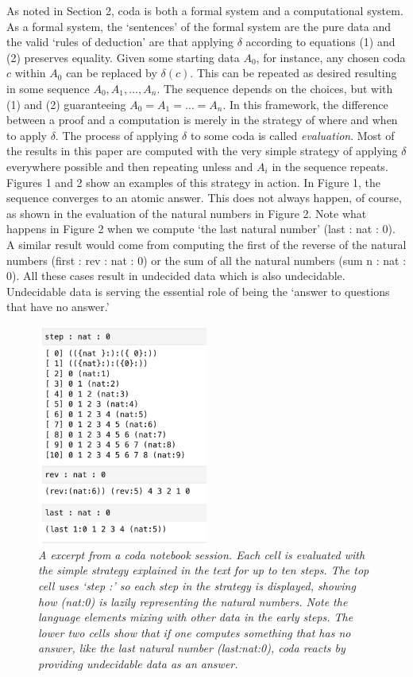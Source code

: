 \documentclass[11pt]{article}
\begin{document}
     As noted in Section 2, coda is both a formal system and a computational system.  As a formal system, the `sentences' of the formal system
are the pure data and the valid `rules of deduction' are that applying $\delta$ according to equations (1) and (2) preserves equality.
Given some starting data $A_0$, for instance, any chosen coda $c$ within $A_0$ can be replaced by $\delta(c)$.  This can be repeated
as desired resulting in some sequence $A_0,A_1,\dots,A_n$.  The sequence depends on the choices, but with (1) and (2) guaranteeing
$A_0=A_1=\dots=A_n$.  In this framework, the difference between a proof and a computation is merely in the strategy of where and
when to apply $\delta$.  The process of applying $\delta$ to some coda is called {\it evaluation}.  Most of the results in this paper
are computed with the very simple strategy of applying $\delta$ everywhere possible and then repeating unless and $A_i$ in the sequence
repeats.  Figures 1 and 2 show an examples of this strategy in action.  In Figure 1, the sequence converges to an atomic answer.  This does
not always happen, of course, as shown in the evaluation of the natural numbers in Figure 2.  Note what happens in Figure 2 when we compute
`the last natural number'
(last : nat : 0).  A similar result would come from computing the first of the reverse of the natural numbers (first : rev : nat : 0) or the sum of all
the natural numbers (sum n : nat : 0).  All these cases result in undecided data which is also undecidable.  Undecidable data is serving the
essential role of being the `answer to questions that have no answer.'

\begin{figure}[h]
\centering
\includegraphics[width=0.5\textwidth]{nat.png}
\caption{{\it A excerpt from a coda notebook session\cite{github}.  Each cell is evaluated with the simple strategy explained in the text for up to ten
steps.  The top cell uses `step :' so each step in the strategy is displayed, showing how (nat:0) is lazily representing the natural numbers.  Note the language
elements mixing with other data in the early steps. The lower two cells show that if one computes something that has no answer, like the last natural number (last:nat:0), coda reacts by providing undecidable data as an answer.}}
\end{figure}
\end{document}
